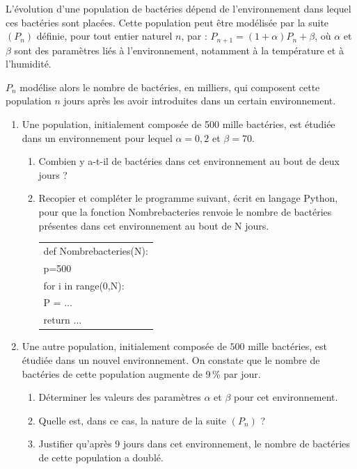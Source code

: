 \medskip

L'évolution d'une population de bactéries dépend de l'environnement dans lequel ces bactéries sont placées. Cette population peut être modélisée par la suite $(P_n)$ définie, pour tout entier naturel $n$, par : $P_{n+1}= (1+\alpha)P_n+\beta$, où $\alpha$ et $\beta$ sont des paramètres liés à l'environnement, notamment à la température et à l'humidité.

$P_n$ modélise alors le nombre de bactéries, en milliers, qui composent cette population $n$ jours après les avoir introduites dans un certain environnement.

\medskip

\begin{enumerate}
\item  Une population, initialement composée de 500 mille bactéries, est étudiée dans un
environnement pour lequel $\alpha=0,2$ et $\beta=70$.
\begin{enumerate}
\item  Combien y a-t-il de bactéries dans cet environnement au bout de deux jours ?
\item Recopier et compléter le programme suivant, écrit en langage Python, pour que la
fonction Nombrebacteries renvoie le nombre de bactéries présentes dans cet environnement au bout de N jours.

\begin{center}
\begin{tabular}[]{|l}
def Nombrebacteries(N):\\
	p=500\\
	for i in range(0,N):\\
	\phantom{xxx}		P = $\dots$\\
	return $\dots$\\
\end{tabular}
\end{center}
\end{enumerate}
\item Une autre population, initialement composée de $500$ mille bactéries, est étudiée dans un
nouvel environnement. On constate que le nombre de bactéries de cette population augmente de 9\,\% par jour.
	\begin{enumerate}
		\item Déterminer les valeurs des paramètres $\alpha$ et $\beta$ pour cet environnement.
		\item Quelle est, dans ce cas, la nature de la suite $\left(P_n\right)$ ?
		\item Justifier qu'après 9 jours dans cet environnement, le nombre de bactéries de cette population
a doublé.
	\end{enumerate}
\end{enumerate}
\vspace{0,5cm}
